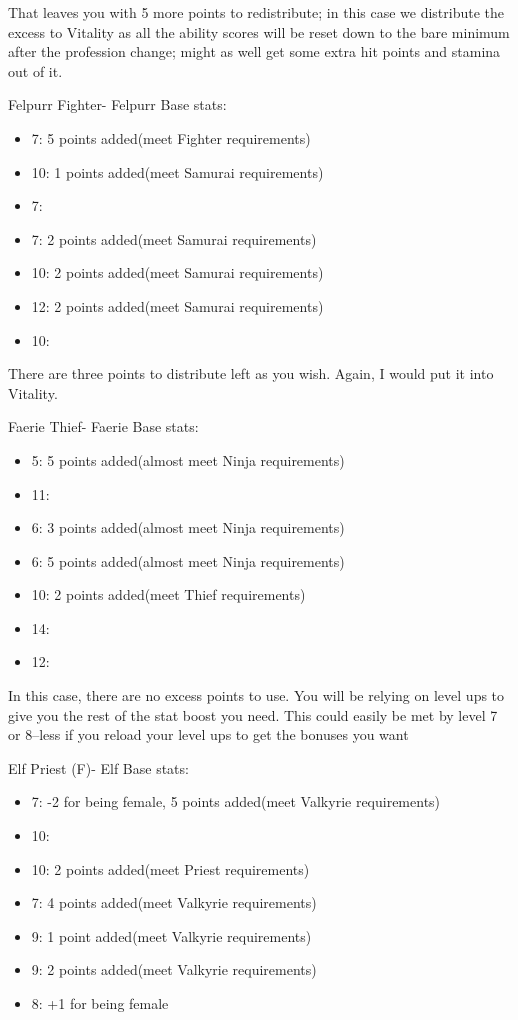 \documentclass[12pt]{article}
\providecommand{\tightlist}{%
  \setlength{\itemsep}{0pt}\setlength{\parskip}{0pt}}
\begin{document}
That leaves you with 5 more points to redistribute; in this case we
distribute the excess to Vitality as all the ability scores will be
reset down to the bare minimum after the profession change; might as
well get some extra hit points and stamina out of it.

Felpurr Fighter- Felpurr Base stats:

\begin{itemize}
\tightlist
\item
  7: 5 points added(meet Fighter requirements)
\item
  10: 1 points added(meet Samurai requirements)
\item
  7:
\item
  7: 2 points added(meet Samurai requirements)
\item
  10: 2 points added(meet Samurai requirements)
\item
  12: 2 points added(meet Samurai requirements)
\item
  10:
\end{itemize}

There are three points to distribute left as you wish. Again, I would
put it into Vitality.

Faerie Thief- Faerie Base stats:

\begin{itemize}
\tightlist
\item
  5: 5 points added(almost meet Ninja requirements)
\item
  11:
\item
  6: 3 points added(almost meet Ninja requirements)
\item
  6: 5 points added(almost meet Ninja requirements)
\item
  10: 2 points added(meet Thief requirements)
\item
  14:
\item
  12:
\end{itemize}

In this case, there are no excess points to use. You will be relying on
level ups to give you the rest of the stat boost you need. This could
easily be met by level 7 or 8--less if you reload your level ups to get
the bonuses you want

Elf Priest (F)- Elf Base stats:

\begin{itemize}
\tightlist
\item
  7: -2 for being female, 5 points added(meet Valkyrie requirements)
\item
  10:
\item
  10: 2 points added(meet Priest requirements)
\item
  7: 4 points added(meet Valkyrie requirements)
\item
  9: 1 point added(meet Valkyrie requirements)
\item
  9: 2 points added(meet Valkyrie requirements)
\item
  8: +1 for being female
\end{itemize}
\end{document}
